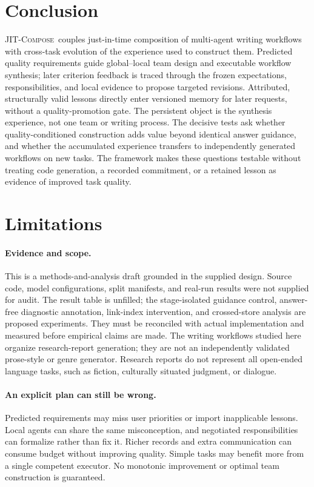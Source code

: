 \documentclass[11pt]{article}
\newcommand{\method}{\mbox{\textsc{JIT-Compose}}}
\begin{document}
\section{Conclusion}
\label{sec:conclusion}

\method\ couples just-in-time composition of multi-agent writing workflows with cross-task evolution of the experience used to construct them. Predicted quality requirements guide global--local team design and executable workflow synthesis; later criterion feedback is traced through the frozen expectations, responsibilities, and local evidence to propose targeted revisions. Attributed, structurally valid lessons directly enter versioned memory for later requests, without a quality-promotion gate. The persistent object is the synthesis experience, not one team or writing process. The decisive tests ask whether quality-conditioned construction adds value beyond identical answer guidance, and whether the accumulated experience transfers to independently generated workflows on new tasks. The framework makes these questions testable without treating code generation, a recorded commitment, or a retained lesson as evidence of improved task quality.
\label{mainend}

\section*{Limitations}

\paragraph{Evidence and scope.}
This is a methods-and-analysis draft grounded in the supplied design. Source code, model configurations, split manifests, and real-run results were not supplied for audit. The result table is unfilled; the stage-isolated guidance control, answer-free diagnostic annotation, link-index intervention, and crossed-store analysis are proposed experiments. They must be reconciled with actual implementation and measured before empirical claims are made. The writing workflows studied here organize research-report generation; they are not an independently validated prose-style or genre generator. Research reports do not represent all open-ended language tasks, such as fiction, culturally situated judgment, or dialogue.

\paragraph{An explicit plan can still be wrong.}
Predicted requirements may miss user priorities or import inapplicable lessons. Local agents can share the same misconception, and negotiated responsibilities can formalize rather than fix it. Richer records and extra communication can consume budget without improving quality. Simple tasks may benefit more from a single competent executor. No monotonic improvement or optimal team construction is guaranteed.
\end{document}
